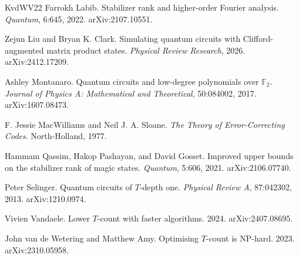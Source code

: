 \documentclass[11pt]{article}
\theoremstyle{definition}
\theoremstyle{remark}
\begin{document}
\begin{thebibliography}{KvdWV22}
 Farrokh Labib. Stabilizer rank and higher-order Fourier analysis. \emph{Quantum}, 6:645, 2022. arXiv:2107.10551.

 Zejun Liu and Bryan K. Clark. Simulating quantum circuits with Clifford-augmented matrix product states. \emph{Physical Review Research}, 2026. arXiv:2412.17209.

 Ashley Montanaro. Quantum circuits and low-degree polynomials over $\mathbb{F}_2$. \emph{Journal of Physics A: Mathematical and Theoretical}, 50:084002, 2017. arXiv:1607.08473.

 F. Jessie MacWilliams and Neil J. A. Sloane. \emph{The Theory of Error-Correcting Codes}. North-Holland, 1977.

 Hammam Qassim, Hakop Pashayan, and David Gosset. Improved upper bounds on the stabilizer rank of magic states. \emph{Quantum}, 5:606, 2021. arXiv:2106.07740.

 Peter Selinger. Quantum circuits of $T$-depth one. \emph{Physical Review A}, 87:042302, 2013. arXiv:1210.0974.

 Vivien Vandaele. Lower $T$-count with faster algorithms. 2024. arXiv:2407.08695.

 John van de Wetering and Matthew Amy. Optimising $T$-count is NP-hard. 2023. arXiv:2310.05958.

\end{thebibliography}
\end{document}
